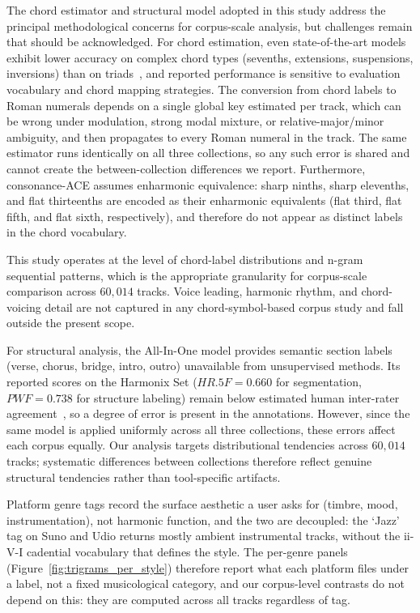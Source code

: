 \documentclass{article}
\newcommand{\rev}[1]{{\color{r2}#1}} %
\begin{document}
The chord estimator and structural model adopted in this study 
address the principal methodological concerns for corpus-scale analysis, but challenges remain that should be acknowledged. For chord estimation, even state-of-the-art models exhibit lower accuracy on complex chord types (sevenths, extensions, suspensions, inversions) than on triads~\citep{pauwels2013evaluating}, and reported performance is sensitive to evaluation vocabulary and chord mapping strategies. \rev{The conversion from chord labels to Roman numerals depends on a single global key estimated per track, which can be wrong under modulation, strong modal mixture, or relative-major/minor ambiguity, and then propagates to every Roman numeral in the track. The same estimator runs identically on all three collections, so any such error is shared and cannot create the between-collection differences we report.} Furthermore, consonance-ACE assumes enharmonic equivalence: sharp ninths, sharp elevenths, and flat thirteenths are encoded as their enharmonic equivalents (flat third, flat fifth, and flat sixth, respectively), and therefore do not appear as distinct labels in the chord vocabulary.

This study operates at the level of chord-label distributions and n-gram sequential patterns, which is the appropriate granularity for corpus-scale comparison across $60,014$ tracks. Voice leading, harmonic rhythm, and chord-voicing detail are not captured in any chord-symbol-based corpus study and fall outside the present scope.

For structural analysis, the All-In-One model provides semantic section labels (verse, chorus, bridge, intro, outro) unavailable from unsupervised methods. Its reported scores on the Harmonix Set ($HR.5F = 0.660$ for segmentation, $PWF = 0.738$ for structure labeling) remain below estimated human inter-rater agreement~\citep{nieto2020audio}, so a degree of error is present in the annotations. However, since the same model is applied uniformly across all three collections, these errors affect each corpus equally. Our analysis targets distributional tendencies across $60,014$ tracks; systematic differences between collections therefore reflect genuine structural tendencies rather than tool-specific artifacts.

\rev{Platform genre tags record the surface aesthetic a user asks for (timbre, mood, instrumentation), not harmonic function, and the two are decoupled: the `Jazz' tag on Suno and Udio returns mostly ambient instrumental tracks, without the ii-V-I cadential vocabulary that defines the style. The per-genre panels (Figure~\ref{fig:trigrams_per_style}) therefore report what each platform files under a label, not a fixed musicological category, and our corpus-level contrasts do not depend on this: they are computed across all tracks regardless of tag.}
\end{document}
